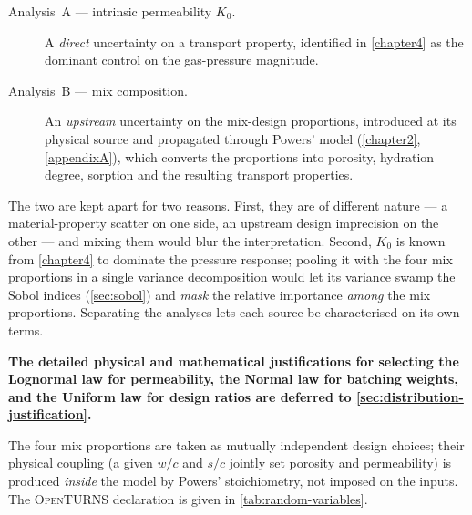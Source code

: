 \begin{description}
  \item[Analysis~A --- intrinsic permeability $K_0$.] A \emph{direct} uncertainty on a transport property, identified in \cref{chapter4} as the dominant control on the gas-pressure magnitude.
  \item[Analysis~B --- mix composition.] An \emph{upstream} uncertainty on the mix-design proportions, introduced at its physical source and propagated through Powers' model (\cref{chapter2}, \cref{appendixA}), which converts the proportions into porosity, hydration degree, sorption and the resulting transport properties.
\end{description}
 
The two are kept apart for two reasons. First, they are of different nature --- a material-property scatter on one side, an upstream design imprecision on the other --- and mixing them would blur the interpretation. Second, $K_0$ is known from \cref{chapter4} to dominate the pressure response; pooling it with the four mix proportions in a single variance decomposition would let its variance swamp the Sobol indices (\cref{sec:sobol}) and \emph{mask} the relative importance \emph{among} the mix proportions. Separating the analyses lets each source be characterised on its own terms.

\textbf{The detailed physical and mathematical justifications for selecting the Lognormal law for permeability, the Normal law for batching weights, and the Uniform law for design ratios are deferred to \cref{sec:distribution-justification}.}

The four mix proportions are taken as mutually independent design choices; their physical coupling (a given $w/c$ and $s/c$ jointly set porosity and permeability) is produced \emph{inside} the model by Powers' stoichiometry, not imposed on the inputs. The \textsc{OpenTURNS} declaration is given in \cref{tab:random-variables}.
 
